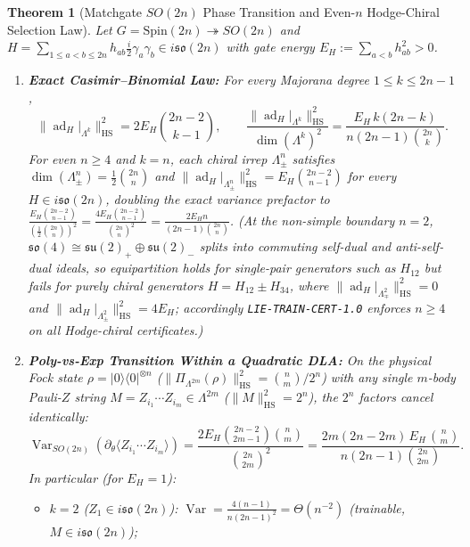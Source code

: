 \documentclass[11pt,a4paper]{article}
\newtheorem{theorem}{Theorem}[section]
\theoremstyle{definition}
\theoremstyle{remark}
\newcommand{\Var}{\operatorname{Var}}
\newcommand{\ad}{\operatorname{ad}}
\newcommand{\HS}{\mathrm{HS}}
\newcommand{\so}{\mathfrak{so}}
\newcommand{\su}{\mathfrak{su}}
\newcommand{\certschema}{\texttt{LIE-TRAIN-CERT-1.0}}
\begin{document}
\begin{theorem}[Matchgate $SO(2n)$ Phase Transition and Even-$n$ Hodge-Chiral Selection Law]\label{thm:so2n}
Let $G = \mathrm{Spin}(2n) \twoheadrightarrow SO(2n)$ and $H = \sum_{1 \le a < b \le 2n} h_{ab}\frac{i}{2}\gamma_a\gamma_b \in i\so(2n)$ with gate energy $E_H := \sum_{a<b} h_{ab}^2 > 0$.
\begin{enumerate}[leftmargin=1.8em,itemsep=3pt]
  \item \textbf{Exact Casimir--Binomial Law:} For every Majorana degree $1 \le k \le 2n-1$,
  \begin{equation}\label{eq:so2n-casimir}
    \|\ad_H|_{\Lambda^k}\|_{\HS}^2 = 2 E_H \binom{2n-2}{k-1},
    \qquad
    \frac{\|\ad_H|_{\Lambda^k}\|_{\HS}^2}{\dim(\Lambda^k)^2}
    = \frac{E_H\, k(2n-k)}{n(2n-1)\binom{2n}{k}}.
  \end{equation}
  For even $n \ge 4$ and $k=n$, each chiral irrep $\Lambda^n_\pm$ satisfies $\dim(\Lambda^n_\pm) = \frac{1}{2}\binom{2n}{n}$ and $\|\ad_H|_{\Lambda^n_\pm}\|_{\HS}^2 = E_H \binom{2n-2}{n-1}$ for \emph{every} $H \in i\so(2n)$, doubling the exact variance prefactor to $\frac{E_H \binom{2n-2}{n-1}}{(\frac{1}{2}\binom{2n}{n})^2} = \frac{4 E_H \binom{2n-2}{n-1}}{\binom{2n}{n}^2} = \frac{2 E_H n}{(2n-1)\binom{2n}{n}}$. (At the non-simple boundary $n=2$, $\so(4) \cong \su(2)_+ \oplus \su(2)_-$ splits into commuting self-dual and anti-self-dual ideals, so equipartition holds for single-pair generators such as $H_{12}$ but fails for purely chiral generators $H = H_{12} \pm H_{34}$, where $\|\ad_H|_{\Lambda^2_\mp}\|_{\HS}^2 = 0$ and $\|\ad_H|_{\Lambda^2_\pm}\|_{\HS}^2 = 4 E_H$; accordingly \certschema{} enforces $n \ge 4$ on all Hodge-chiral certificates.)
  \item \textbf{Poly-vs-Exp Transition Within a Quadratic DLA:} On the physical Fock state $\rho = |0\rangle\langle 0|^{\otimes n}$ ($\|\Pi_{\Lambda^{2m}}(\rho)\|_{\HS}^2 = \binom{n}{m}/2^n$) with any single $m$-body Pauli-$Z$ string $M = Z_{i_1}\cdots Z_{i_m} \in \Lambda^{2m}$ ($\|M\|_{\HS}^2 = 2^n$), the $2^n$ factors cancel identically:
  \begin{equation}\label{eq:so2n-fock}
    \Var_{SO(2n)}(\partial_\theta \langle Z_{i_1}\cdots Z_{i_m}\rangle)
    = \frac{2 E_H \binom{2n-2}{2m-1}\binom{n}{m}}{\binom{2n}{2m}^2}
    = \frac{2m(2n-2m)\,E_H\,\binom{n}{m}}{n(2n-1)\binom{2n}{2m}}.
  \end{equation}
  In particular (for $E_H = 1$):
  \begin{itemize}[leftmargin=1.4em,itemsep=1pt]
    \item $k=2$ ($Z_1 \in i\so(2n)$): $\Var = \frac{4(n-1)}{n(2n-1)^2} = \Theta(n^{-2})$ (\emph{trainable, $M \in i\so(2n)$});

\end{itemize}
\end{enumerate}
\end{theorem}
\end{document}
